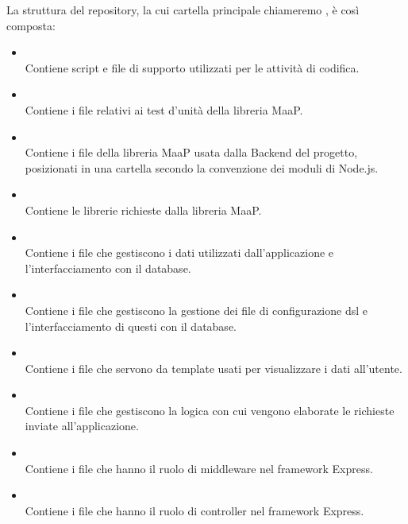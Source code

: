 La struttura del repository, la cui cartella principale chiameremo , è così composta:
\begin{itemize}
 \item \textbf{} \\
	Contiene script e file di supporto utilizzati per le attività di codifica.

 \item \textbf{} \\
	Contiene i file relativi ai test d'unità della libreria MaaP.

 \item \textbf{} \\
	Contiene i file della libreria MaaP usata dalla Backend del progetto, posizionati in una cartella  secondo la convenzione dei moduli di Node.js.

 \item \textbf{} \\
	Contiene le librerie richieste dalla libreria MaaP.

 \item \textbf{} \\
	Contiene i file che gestiscono i dati utilizzati dall'applicazione e l'interfacciamento con il database.

 \item \textbf{} \\
	Contiene i file che gestiscono la gestione dei file di configurazione dsl e l'interfacciamento di questi con il database.

 \item \textbf{} \\
	Contiene i file che servono da template usati per visualizzare i dati all'utente.

 \item \textbf{} \\
	Contiene i file che gestiscono la logica con cui vengono elaborate le richieste inviate all'applicazione.

 \item \textbf{} \\
	Contiene i file che hanno il ruolo di middleware nel framework Express.

 \item \textbf{} \\
	Contiene i file che hanno il ruolo di controller nel framework Express.


\end{itemize}
